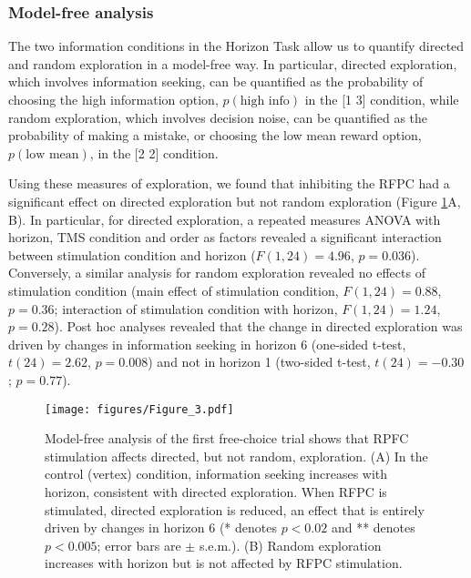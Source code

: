\documentclass[12pt]{article}
\begin{document}
\subsubsection*{Model-free analysis}

The two information conditions in the Horizon Task allow us to quantify directed and random exploration in a model-free way.  In particular, directed exploration, which involves information seeking, can be quantified as the probability of choosing the high information option, $p(\mbox{high info})$ in the [1 3] condition, while random exploration, which involves decision noise, can be quantified as the probability of making a mistake, or choosing the low mean reward option, $p(\mbox{low mean})$, in the [2 2] condition.  


Using these measures of exploration, we found that inhibiting the RFPC had a significant effect on directed exploration but not random exploration (Figure \ref{fig:mf}A, B).  In particular, for directed exploration, a repeated measures ANOVA with horizon, TMS condition and order as factors revealed a significant interaction between stimulation condition and horizon ($F(1, 24) = 4.96$, $p = 0.036$). Conversely, a similar analysis for random exploration revealed no effects of stimulation condition (main effect of stimulation condition, $F(1, 24) = 0.88$, $p = 0.36$; interaction of stimulation condition with horizon, $F(1, 24) = 1.24$, $p = 0.28$).  Post hoc analyses revealed that the change in directed exploration was driven by changes in information seeking in horizon 6 (one-sided t-test, $t(24) = 2.62$, $p = 0.008$) and not in horizon 1 (two-sided t-test, $t(24) = -0.30$; $p = 0.77$). 

\begin{figure}[t]
\begin{center}
		\texttt{[image: figures/Figure\_3.pdf]}
\caption{Model-free analysis of the first free-choice trial shows that RPFC stimulation affects directed, but not random, exploration. (A) In the control (vertex) condition, information seeking increases with horizon, consistent with directed exploration. When RFPC is stimulated, directed exploration is reduced, an effect that is entirely driven by changes in horizon 6 (* denotes $p < 0.02$ and ** denotes $p < 0.005$; error bars are $\pm$ s.e.m.). (B) Random exploration increases with horizon but is not affected by RFPC stimulation. }
\label{fig:mf}
\end{center}
\end{figure}
\end{document}
